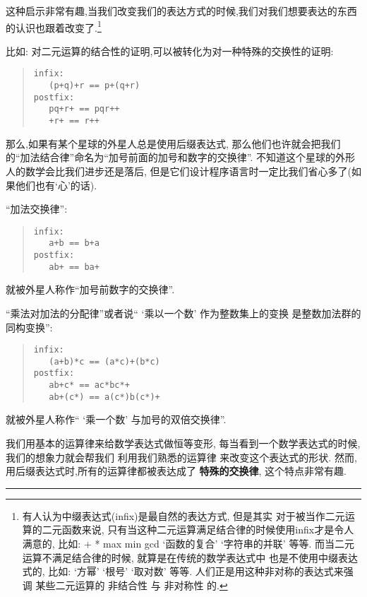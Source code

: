 \documentclass[a4paper]{article}
\begin{document}
这种启示非常有趣,当我们改变我们的表达方式的时候,我们对我们想要表达的东西的认识也跟着改变了.\footnote{有人认为中缀表达式(infix)是最自然的表达方式,
但是其实 对于被当作二元运算的二元函数来说,
只有当这种二元运算满足结合律的时候使用infix才是令人满意的,
比如: + * max min gcd `函数的复合' `字符串的并联' 等等.
而当二元运算不满足结合律的时候,
就算是在传统的数学表达式中 也是不使用中缀表达式的,
比如: `方幂' `根号' `取对数' 等等.
人们正是用这种非对称的表达式来强调 某些二元运算的 非结合性 与 非对称性 的.}

比如:
对二元运算的结合性的证明,可以被转化为对一种特殊的交换性的证明:

\begin{quote}
\begin{verbatim}
infix:
   (p+q)+r == p+(q+r)
postfix:
   pq+r+ == pqr++
   +r+ == r++
\end{verbatim}
\end{quote}

那么,如果有某个星球的外星人总是使用后缀表达式,
那么他们也许就会把我们的``加法结合律''命名为``加号前面的加号和数字的交换律''.
不知道这个星球的外形人的数学会比我们进步还是落后,
但是它们设计程序语言时一定比我们省心多了(如果他们也有`心'的话).

``加法交换律'':

\begin{quote}
\begin{verbatim}
infix:
   a+b == b+a
postfix:
   ab+ == ba+
\end{verbatim}
\end{quote}
就被外星人称作``加号前数字的交换律''.

``乘法对加法的分配律''或者说`` `乘以一个数' 作为整数集上的变换 是整数加法群的同构变换'':

\begin{quote}
\begin{verbatim}
infix:
   (a+b)*c == (a*c)+(b*c)
postfix:
   ab+c* == ac*bc*+
   ab+(c*) == a(c*)b(c*)+
\end{verbatim}
\end{quote}
就被外星人称作`` `乘一个数' 与加号的双倍交换律''.

我们用基本的运算律来给数学表达式做恒等变形,
每当看到一个数学表达式的时候,
我们的想象力就会帮我们 利用我们熟悉的运算律 来改变这个表达式的形状.
然而,用后缀表达式时,所有的运算律都被表达成了 \textbf{特殊的交换律},
这个特点非常有趣.




\vspace{.5cm}\hrule\vspace{.5cm}
\end{document}
